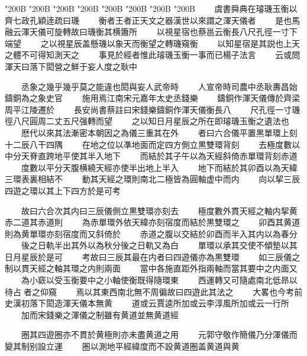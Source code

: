 \begin{正文}
\char"200B\relax{}
\char"200B\relax{}
\char"200B\relax{}
\char"200B\relax{}
\char"200B\relax{}
\char"200B\relax{}
\char"200B\relax{}
\char"200B\relax{}
　　虞書舜典在璿璣玉衡以齊七政孔穎逹疏曰璣
　　衡者王者正天文之器漢世以來謂之渾天儀者
　　是也馬融云渾天儀可旋轉故曰璣衡其横簫所
　　以視星宿也蔡邕云衡長八尺孔徑一寸下端望
　　之以視星辰盖懸璣以象天而衡望之轉璣窺衡
　　以知星宿是其説也上天之體不可得知測天之
　　事見於經者惟此璿璣玉衡一事而已楊子法言
　　云或問渾天曰落下閎營之鮮于妄人度之耿中
\par
　　丞象之幾乎幾乎莫之能違也閎與妄人武帝時
　　人宣帝時司農中丞耿夀昌始鑄銅為之象史官
　　施用焉江南宋元嘉年太史丞錢樂
　　鑄銅作渾天儀傳於齊梁周平江陵遷於
　　長安尚書蔡註曰宋錢樂鑄銅作渾天儀衡長八
　　尺孔徑一寸璣徑八尺圓周二丈五尺强轉而望
　　之以知日月星辰之所在即璿璣玉衡之遺法也
　　厯代以來其法漸密本朝因之為儀三重其在外
　　者曰六合儀平置黒單環上刻十二辰八干四隅
　　在地之位以凖地面而定四方側立黒雙環背刻
　　去極度數以中分天脊直跨地平使其半入地下
　　而結於其子午以為天經斜倚赤單環背刻赤道
　　度數以平分天腹横繞天經亦使半出地上半入
　　地下而結於其卯酉以為天緯三環表裏相結不
　　動其天經之環則南北二極皆為圓軸虚中而内
　　向以挈三辰四遊之環以其上下四方於是可考
\par
　　故曰六合次其内曰三辰儀側立黒雙環亦刻去
　　極度數外貫天經之軸内挈黄赤二道其赤道則
　　為赤單環外依天緯亦刻宿度而結於黒雙環之
　　卯酉其黄道則為黄單環亦刻宿度而又斜倚於
　　赤道之腹以交結於卯酉而半入其内以為春分
　　後之日軌半出其外以為秋分後之日軌又為白
　　單環以承其交使不傾墊以其日月星辰於是可
　　考故曰三辰其最在内者曰四遊儀亦為黒雙環
　　如三辰儀之制以貫天經之軸其環之内則兩面
　　當中各施直距外指兩軸而當其要中之内面又
　　為小窽以受玉衡要中之小軸使衡既得隨環東
　　西運轉又可隨處南北低昻以待占𠉀者之仰窺
　　焉以其東西南北無不周徧故曰四遊此其法之
　　大畧也今考前史漢初落下閎造渾天儀本無黄
　　道或云賈逵所加或云李淳風所加或云一行所
　　加而宋錢樂之渾儀之制雖有黄道並無黄道經
\par
　　圈其四遊圈亦不貫於黄極則亦未盡黄道之用
　　元郭守敬作簡儀乃分渾儀而變其制别設立運
　　圏以測地平經緯度而不設黄道圏盖黄道與黄

\end{正文}
